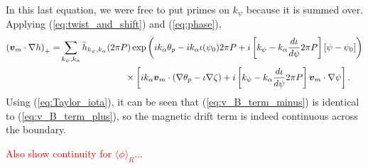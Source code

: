 \documentclass[11pt,letter]{article}
\newcommand{\vect}[1]{\mbox{\boldmath $#1$}}
\newcommand{\todo}[1]{\textcolor{red}{#1}}
\begin{document}
In this last equation, we were free to put primes on $k_\psi$ because it is summed over. Applying 
(\ref{eq:twist_and_shift}) and (\ref{eq:phase}),
\begin{align}
\left(\vect{v}_{m}\cdot \nabla h \right)_+
=& 
\sum_{k_\psi,k_\alpha} \bar{h}_{k_\psi,k_\alpha}(2\pi P) 
\exp \left( i k_\alpha \theta_p   -i k_\alpha \iota(\psi_0) 2\pi P+ i \left[ k_\psi - k_\alpha \frac{d\iota}{d\psi}  2 \pi P\right] [\psi - \psi_0] \right) \nonumber \\
& \hspace{1in} \times \left[ i k_\alpha \vect{v}_{m}\cdot \left(\nabla \theta_p - \iota \nabla\zeta \right) + i \left[ k_\psi - k_\alpha \frac{d\iota}{d\psi}  2 \pi P\right] \vect{v}_{m}\cdot\nabla\psi \right].
\label{eq:v_B_term_plus}
\end{align}
Using (\ref{eq:Taylor_iota}), it can be seen that (\ref{eq:v_B_term_minus}) is identical to  (\ref{eq:v_B_term_plus}),
so the magnetic drift term is indeed continuous across the boundary.

\todo{Also show continuity for $\langle \phi \rangle_R$...}

\begin{comment}

perpendicular wavenumber appearing inside the Bessel functions:
\begin{equation}
k_{\perp}^2 = k_\alpha^2 |\nabla \alpha|^2 + 2 k_\alpha k_\psi \nabla\alpha\times\nabla\psi + k_\psi^2 |\nabla\psi|^2.
\label{eq:kperp2}
\end{equation}
Using
\begin{equation}
\nabla\alpha = \nabla\theta_p - \iota \nabla\zeta - \zeta \frac{d\iota}{d\psi} \nabla\psi,
\end{equation}
we find that (\ref{eq:kperp2}) 

\end{comment}
\end{document}
